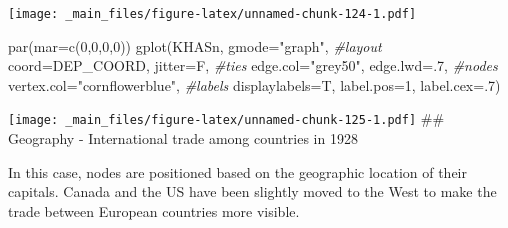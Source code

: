 \documentclass[
  notitlepage,
  onecolumn,
  openany]{book}
\newenvironment{Shaded}{\begin{snugshade}}{\end{snugshade}}
\newcommand{\AttributeTok}[1]{\textcolor[rgb]{0.77,0.63,0.00}{#1}}
\newcommand{\CommentTok}[1]{\textcolor[rgb]{0.56,0.35,0.01}{\textit{#1}}}
\newcommand{\DecValTok}[1]{\textcolor[rgb]{0.00,0.00,0.81}{#1}}
\newcommand{\FunctionTok}[1]{\textcolor[rgb]{0.00,0.00,0.00}{#1}}
\newcommand{\NormalTok}[1]{#1}
\newcommand{\StringTok}[1]{\textcolor[rgb]{0.31,0.60,0.02}{#1}}
\begin{document}
\texttt{[image: \_main\_files/figure-latex/unnamed-chunk-124-1.pdf]}

\begin{Shaded}
\begin{Highlighting}[]
\FunctionTok{par}\NormalTok{(}\AttributeTok{mar=}\FunctionTok{c}\NormalTok{(}\DecValTok{0}\NormalTok{,}\DecValTok{0}\NormalTok{,}\DecValTok{0}\NormalTok{,}\DecValTok{0}\NormalTok{))}
\FunctionTok{gplot}\NormalTok{(KHASn,}
      \AttributeTok{gmode=}\StringTok{"graph"}\NormalTok{,}
      \CommentTok{\#layout}
      \AttributeTok{coord=}\NormalTok{DEP\_COORD,}
      \AttributeTok{jitter=}\NormalTok{F,}
      \CommentTok{\#ties}
      \AttributeTok{edge.col=}\StringTok{"grey50"}\NormalTok{,}
      \AttributeTok{edge.lwd=}\NormalTok{.}\DecValTok{7}\NormalTok{,}
      \CommentTok{\#nodes}
      \AttributeTok{vertex.col=}\StringTok{"cornflowerblue"}\NormalTok{,}
      \CommentTok{\#labels}
      \AttributeTok{displaylabels=}\NormalTok{T, }
      \AttributeTok{label.pos=}\DecValTok{1}\NormalTok{, }
      \AttributeTok{label.cex=}\NormalTok{.}\DecValTok{7}\NormalTok{)}
\end{Highlighting}
\end{Shaded}

\texttt{[image: \_main\_files/figure-latex/unnamed-chunk-125-1.pdf]}
\#\# Geography - International trade among countries in 1928

In this case, nodes are positioned based on the geographic location of their capitals. Canada and the US have been slightly moved to the West to make the trade between European countries more visible.
\end{document}
